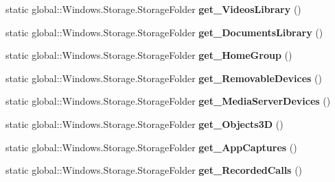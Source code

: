 \begin{DoxyCompactItemize}
\mbox{\label{class_windows_1_1_storage_1_1_known_folders_a4e637cb715e9d1600f05e297b1f73be7}} 
static global\+::\+Windows.\+Storage.\+Storage\+Folder {\bfseries get\+\_\+\+Videos\+Library} ()
\item 
\mbox{\label{class_windows_1_1_storage_1_1_known_folders_a46d0afa10b55b07fcbe5b69b12c6a351}} 
static global\+::\+Windows.\+Storage.\+Storage\+Folder {\bfseries get\+\_\+\+Documents\+Library} ()
\item 
\mbox{\label{class_windows_1_1_storage_1_1_known_folders_afaf43060342706d67a7a25a467545948}} 
static global\+::\+Windows.\+Storage.\+Storage\+Folder {\bfseries get\+\_\+\+Home\+Group} ()
\item 
\mbox{\label{class_windows_1_1_storage_1_1_known_folders_a7d4f37e230205c7d410066952eeac000}} 
static global\+::\+Windows.\+Storage.\+Storage\+Folder {\bfseries get\+\_\+\+Removable\+Devices} ()
\item 
\mbox{\label{class_windows_1_1_storage_1_1_known_folders_afd2c3f741c42f2f472afa0f33c0a19c6}} 
static global\+::\+Windows.\+Storage.\+Storage\+Folder {\bfseries get\+\_\+\+Media\+Server\+Devices} ()
\item 
\mbox{\label{class_windows_1_1_storage_1_1_known_folders_a7538b526a7c946e575ca80ffce8b9c64}} 
static global\+::\+Windows.\+Storage.\+Storage\+Folder {\bfseries get\+\_\+\+Objects3D} ()
\item 
\mbox{\label{class_windows_1_1_storage_1_1_known_folders_ab66696615f1c71c5ee62274cc6643a89}} 
static global\+::\+Windows.\+Storage.\+Storage\+Folder {\bfseries get\+\_\+\+App\+Captures} ()
\item 
\mbox{\label{class_windows_1_1_storage_1_1_known_folders_a02949a31d02148e80a3afd3aed34960d}} 
static global\+::\+Windows.\+Storage.\+Storage\+Folder {\bfseries get\+\_\+\+Recorded\+Calls} ()
\item 

\end{DoxyCompactItemize}

